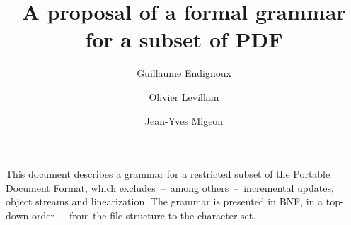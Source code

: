 \documentclass{article}
\title{A proposal of a formal grammar for a subset of PDF}
\author{Guillaume Endignoux \and Olivier Levillain \and Jean-Yves Migeon}
\date{}
\begin{document}
\maketitle

This document describes a grammar for a restricted subset of the Portable Document Format, which excludes~--~among others~--~incremental updates, object streams and linearization. The grammar is presented in BNF, in a top-down order~--~from the file structure to the character set.


\end{document}
